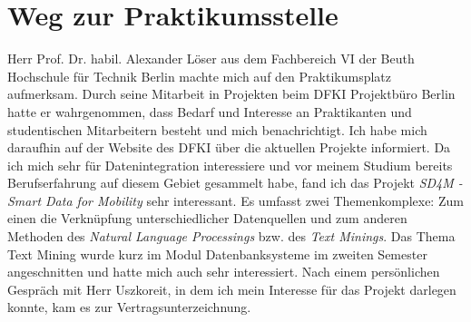 \section{Weg zur Praktikumsstelle}
\label{sec:intro:wegZurPraktikumsstelle}
Herr Prof. Dr. habil. Alexander Löser aus dem Fachbereich VI der Beuth Hochschule für Technik Berlin machte mich auf den Praktikumsplatz aufmerksam. Durch seine Mitarbeit in Projekten beim DFKI Projektbüro Berlin hatte er wahrgenommen, dass Bedarf und Interesse an Praktikanten und studentischen Mitarbeitern besteht und mich benachrichtigt.
Ich habe mich daraufhin auf der Website des DFKI über die aktuellen Projekte informiert.
Da ich mich sehr für Datenintegration interessiere und vor meinem Studium bereits Berufserfahrung auf diesem Gebiet gesammelt habe, fand ich das Projekt \textit{SD4M - Smart Data for Mobility} sehr interessant.
Es umfasst zwei Themenkomplexe: Zum einen die Verknüpfung unterschiedlicher Datenquellen und zum anderen Methoden des \textit{Natural Language Processings} bzw. des \textit{Text Minings}.
Das Thema Text Mining wurde kurz im Modul Datenbanksysteme im zweiten Semester angeschnitten und hatte mich auch sehr interessiert.
Nach einem persönlichen Gespräch mit Herr Uszkoreit, in dem ich mein Interesse für das Projekt darlegen konnte, kam es zur Vertragsunterzeichnung.